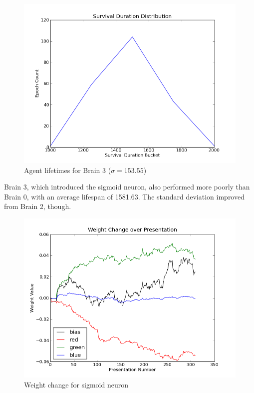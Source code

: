 \begin{figure}
\begin{center}
  \includegraphics[scale=.65]{plots/brain3hist.png}
  \caption{Agent lifetimes for Brain 3 ($\sigma = 153.55$)}
  \label{fig:brain3his}
\end{center}
\end{figure}

Brain 3, which introduced the sigmoid neuron, also performed more poorly
than Brain 0, with an average lifespan of 1581.63. The standard deviation
improved from Brain 2, though.

\begin{figure}
\begin{center}
  \includegraphics[scale=.65]{plots/weights.png}
  \caption{Weight change for sigmoid neuron}
  \label{fig:brain3wghts}
\end{center}
\end{figure}

